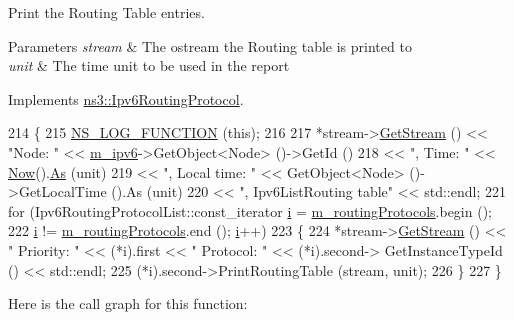 Print the Routing Table entries. 


\begin{DoxyParams}{Parameters}
{\em stream} & The ostream the Routing table is printed to \\
\hline
{\em unit} & The time unit to be used in the report \\
\hline
\end{DoxyParams}


Implements \hyperlink{classns3_1_1Ipv6RoutingProtocol_a2d5f8412f903a1365a1e84c06ad3da43}{ns3\+::\+Ipv6\+Routing\+Protocol}.


\begin{DoxyCode}
214 \{
215   \hyperlink{log-macros-disabled_8h_a90b90d5bad1f39cb1b64923ea94c0761}{NS\_LOG\_FUNCTION} (\textcolor{keyword}{this});
216 
217   *stream->\hyperlink{classns3_1_1OutputStreamWrapper_a0cf30a4188ab6fdae2b2ab74db11acc2}{GetStream} () << \textcolor{stringliteral}{"Node: "} << \hyperlink{classns3_1_1Ipv6ListRouting_af82ea298d92eb8cfcb6c7572e32b517d}{m\_ipv6}->GetObject<Node> ()->GetId ()
218                         << \textcolor{stringliteral}{", Time: "} << \hyperlink{group__simulator_gac3635e2e87f7ce316c89290ee1b01d0d}{Now}().\hyperlink{classns3_1_1Time_a0bb1110638ce9938248bd07865a328ab}{As} (unit)
219                         << \textcolor{stringliteral}{", Local time: "} << GetObject<Node> ()->GetLocalTime ().As (unit)
220                         << \textcolor{stringliteral}{", Ipv6ListRouting table"} << std::endl;
221   \textcolor{keywordflow}{for} (Ipv6RoutingProtocolList::const\_iterator \hyperlink{bernuolliDistribution_8m_a6f6ccfcf58b31cb6412107d9d5281426}{i} = \hyperlink{classns3_1_1Ipv6ListRouting_aec46de403a1c73088ce952d7cbd804e8}{m\_routingProtocols}.begin ();
222        \hyperlink{bernuolliDistribution_8m_a6f6ccfcf58b31cb6412107d9d5281426}{i} != \hyperlink{classns3_1_1Ipv6ListRouting_aec46de403a1c73088ce952d7cbd804e8}{m\_routingProtocols}.end (); \hyperlink{bernuolliDistribution_8m_a6f6ccfcf58b31cb6412107d9d5281426}{i}++)
223     \{
224       *stream->\hyperlink{classns3_1_1OutputStreamWrapper_a0cf30a4188ab6fdae2b2ab74db11acc2}{GetStream} () << \textcolor{stringliteral}{"  Priority: "} << (*i).first << \textcolor{stringliteral}{" Protocol: "} << (*i).second->
      GetInstanceTypeId () << std::endl;
225       (*i).second->PrintRoutingTable (stream, unit);
226     \}
227 \}
\end{DoxyCode}


Here is the call graph for this function\+:


